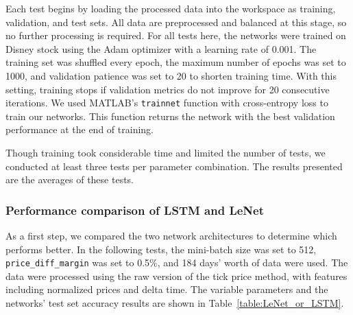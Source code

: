 \documentclass[a4paper,oneside,onecolumn,12pt]{book}
\begin{document}
	Each test begins by loading the processed data into the workspace as training, validation, and test sets. All data are preprocessed and balanced at this stage, so no further processing is required. For all tests here, the networks were trained on Disney stock using the Adam optimizer with a learning rate of 0.001. The training set was shuffled every epoch, the maximum number of epochs was set to 1000, and validation patience was set to 20 to shorten training time. With this setting, training stops if validation metrics do not improve for 20 consecutive iterations. We used MATLAB's \texttt{trainnet} function with cross-entropy loss to train our networks. This function returns the network with the best validation performance at the end of training.

	Though training took considerable time and limited the number of tests, we conducted at least three tests per parameter combination. The results presented are the averages of these tests.

		\subsubsection{Performance comparison of LSTM and LeNet}
		As a first step, we compared the two network architectures to determine which performs better. In the following tests, the mini-batch size was set to 512, \texttt{price\_diff\_margin} was set to 0.5\%, and 184 days' worth of data were used. The data were processed using the raw version of the tick price method, with features including normalized prices and delta time. The variable parameters and the networks' test set accuracy results are shown in Table~\ref{table:LeNet_or_LSTM}.
		\begin{table}[H]
			\begin{center}
			\end{center}
			\caption{Comparison of LSTM and LeNet performance using the raw tick price method.}
			\label{table:LeNet_or_LSTM}
		\end{table}	
\end{document}
